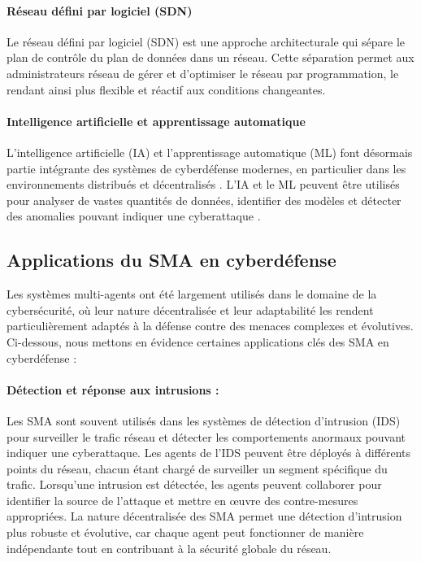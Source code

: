 \paragraph{Réseau défini par logiciel (SDN)}

Le réseau défini par logiciel (SDN) est une approche architecturale qui sépare le plan de contrôle du plan de données dans un réseau. Cette séparation permet aux administrateurs réseau de gérer et d'optimiser le réseau par programmation, le rendant ainsi plus flexible et réactif aux conditions changeantes. \cite{Kreutz2015}

\paragraph{Intelligence artificielle et apprentissage automatique}

L'intelligence artificielle (IA) et l'apprentissage automatique (ML) font désormais partie intégrante des systèmes de cyberdéfense modernes, en particulier dans les environnements distribués et décentralisés \cite{Buczak2016}. L'IA et le ML peuvent être utilisés pour analyser de vastes quantités de données, identifier des modèles et détecter des anomalies pouvant indiquer une cyberattaque \cite{Vinayakumar2019}.


\subsection{Applications du SMA en cyberdéfense}

Les systèmes multi-agents ont été largement utilisés dans le domaine de la cybersécurité, où leur nature décentralisée et leur adaptabilité les rendent particulièrement adaptés à la défense contre des menaces complexes et évolutives. Ci-dessous, nous mettons en évidence certaines applications clés des SMA en cyberdéfense :

\paragraph{Détection et réponse aux intrusions :}
Les SMA sont souvent utilisés dans les systèmes de détection d'intrusion (IDS) pour surveiller le trafic réseau et détecter les comportements anormaux pouvant indiquer une cyberattaque. Les agents de l'IDS peuvent être déployés à différents points du réseau, chacun étant chargé de surveiller un segment spécifique du trafic. Lorsqu'une intrusion est détectée, les agents peuvent collaborer pour identifier la source de l'attaque et mettre en œuvre des contre-mesures appropriées. La nature décentralisée des SMA permet une détection d'intrusion plus robuste et évolutive, car chaque agent peut fonctionner de manière indépendante tout en contribuant à la sécurité globale du réseau.

